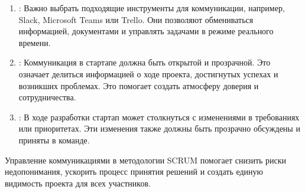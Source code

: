 \documentclass[letterpaper,10pt,russian]{sphinxmanual}
\begin{document}
\begin{enumerate}
\item {} 
\sphinxAtStartPar
{}:
Важно выбрать подходящие инструменты для коммуникации, например, Slack, Microsoft Teams или Trello. Они позволяют обмениваться информацией, документами и управлять задачами в режиме реального времени.

\item {} 
\sphinxAtStartPar
{}:
Коммуникация в стартапе должна быть открытой и прозрачной. Это означает делиться информацией о ходе проекта, достигнутых успехах и возникших проблемах. Это помогает создать атмосферу доверия и сотрудничества.

\item {} 
\sphinxAtStartPar
{}:
В ходе разработки стартап может столкнуться с изменениями в требованиях или приоритетах. Эти изменения также должны быть прозрачно обсуждены и приняты в команде.

\end{enumerate}

\sphinxAtStartPar
Управление коммуникациями в методологии SCRUM помогает снизить риски недопонимания, ускорить процесс принятия решений и создать единую видимость проекта для всех участников.
\end{document}
